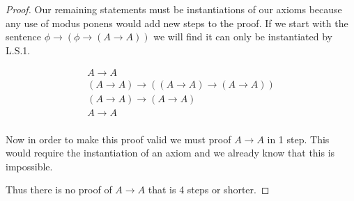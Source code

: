 \documentclass{article}
\begin{document}
\begin{proof}
Our remaining statements must be instantiations of our axioms because any use of modus ponens would add new steps to the proof.
If we start with the sentence $\phi \rightarrow (\phi \rightarrow (A \rightarrow A))$ we will find it can only be instantiated by L.S.1.

\begin{gather*}
A \rightarrow A \\
(A \rightarrow A) \rightarrow ((A \rightarrow A) \rightarrow (A \rightarrow A)) \tag*{L.S.1} \\
(A \rightarrow A) \rightarrow (A \rightarrow A) \tag*{Modus Ponenes} \\
A \rightarrow A \tag*{Modus Ponens}\\
\end{gather*}

Now in order to make this proof valid we must proof $A \rightarrow A$ in 1 step.
This would require the instantiation of an axiom and we already know that this is impossible.

Thus there is no proof of $A \rightarrow A$ that is 4 steps or shorter.
\end{proof}
\end{document}

